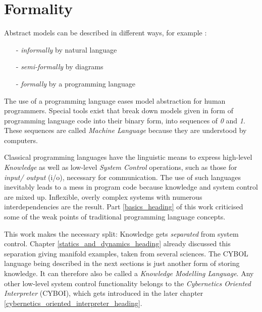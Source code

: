 %
%
%
%
%
%
%

\section{Formality}
\label{formality_heading}

Abstract models can be described in different ways, for example \cite{philippow}:

\begin{itemize}
    \item[-] \emph{informally} by natural language
    \item[-] \emph{semi-formally} by diagrams
    \item[-] \emph{formally} by a programming language
\end{itemize}

The use of a programming language eases model abstraction for human programmers.
Special tools exist that break down models given in form of programming language
code into their binary form, into sequences of \emph{0} and \emph{1}. These
sequences are called \emph{Machine Language} because they are understood by
computers.

Classical programming languages have the linguistic means to express high-level
\emph{Knowledge} as well as low-level \emph{System Control} operations, such as
those for \emph{input/ output} (i/o), necessary for communication. The use of
such languages inevitably leads to a mess in program code because knowledge and
system control are mixed up. Inflexible, overly complex systems with numerous
interdependencies are the result. Part \ref{basics_heading} of this work
criticised some of the weak points of traditional programming language concepts.

This work makes the necessary split: Knowledge gets \emph{separated} from
system control. Chapter \ref{statics_and_dynamics_heading} already discussed
this separation giving manifold examples, taken from several sciences. The CYBOL
language being described in the next sections is just another form of storing
knowledge. It can therefore also be called a \emph{Knowledge Modelling Language}.
Any other low-level system control functionality belongs to the
\emph{Cybernetics Oriented Interpreter} (CYBOI), which gets introduced in the
later chapter \ref{cybernetics_oriented_interpreter_heading}.
